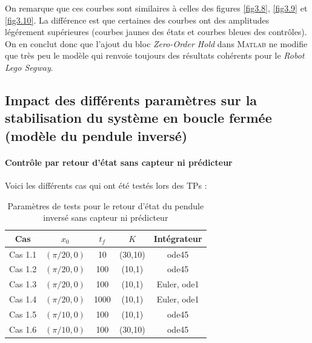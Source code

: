 \documentclass[a4paper]{article}
\begin{document}
                        On remarque que ces courbes sont similaires à celles des figures \ref{fig3.8}, \ref{fig3.9} et \ref{fig3.10}.
                        La différence est que certaines des courbes ont des amplitudes légérement supérieures (courbes jaunes des états et courbes bleues des contrôles).
                        On en conclut donc que l'ajout du bloc \textit{Zero-Order Hold} dans \textsc{Matlab} ne modifie que très peu le modèle 
                        qui renvoie toujours des résultats cohérents pour le \textit{Robot Lego Segway}.


        \subsection{Impact des différents paramètres sur la stabilisation du système en boucle fermée (modèle du pendule inversé)}

                \paragraph{Contrôle par retour d'état sans capteur ni prédicteur} 
                
                        Voici les différents cas qui ont été testés lors des TPs :
                        \begin{table}[h!]
                                \centering
                                \begin{tabular}{|c||c|c|c|c|} \hline
                                        \textbf{Cas} & \textbf{$x_0$} & \textbf{$t_f$} & \textbf{$K$} & \textbf{Intégrateur} \\ \hline
                                        Cas 1.1 & $(\pi/20,0)$ & 10 & (30,10) & ode45 \\ \hline
                                        Cas 1.2 & $(\pi/20,0)$ & 100 & (10,1) & ode45 \\ \hline
                                        Cas 1.3 & $(\pi/20,0)$ & 100 & (10,1) & Euler, ode1 \\ \hline
                                        Cas 1.4 & $(\pi/20,0)$ & 1000 & (10,1) & Euler, ode1 \\ \hline
                                        Cas 1.5 & $(\pi/10,0)$ & 100 & (10,1) & ode45 \\ \hline
                                        Cas 1.6 & $(\pi/10,0)$ & 100 & (30,10) & ode45 \\ \hline
                                \end{tabular}
                                \label{table1}
                                \caption{Paramètres de tests pour le retour d'état du pendule inversé sans capteur ni prédicteur}
                        \end{table}
\end{document}
